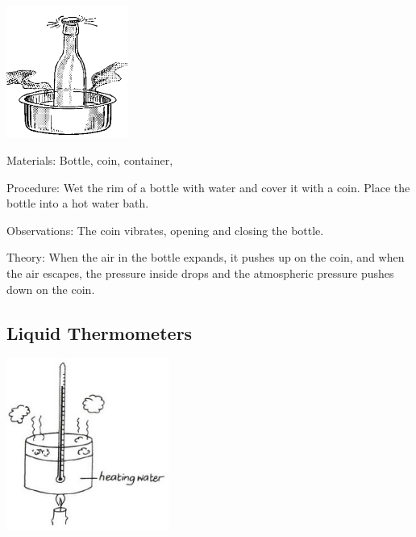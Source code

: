\begin{multicols}{2}
\begin{center}
\includegraphics[width=0.3\textwidth]{./img/source/jumping-coin.png}
\end{center}

\begin{description*}
\item[Materials:]{Bottle, coin, container, }
\item[Procedure:]{Wet the rim of a bottle with water and cover it with a coin. Place the bottle into a hot water bath.}
\item[Observations:]{The coin vibrates, opening and closing the bottle.}
\item[Theory:]{When the air in the bottle expands, it pushes up on the coin, and when the air escapes, the pressure inside drops and the atmospheric pressure pushes down on the coin.}
\end{description*}

\subsection{Liquid Thermometers}

\begin{center}
\includegraphics[width=0.4\textwidth]{./img/vso/liquid-thermometers.png}
\end{center}


\end{multicols}

